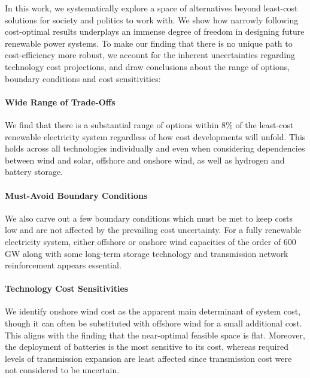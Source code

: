 In this work, we systematically explore a space of alternatives beyond
least-cost solutions for society and politics to work with. We show how narrowly
following cost-optimal results underplays an immense degree of freedom in
designing future renewable power systems. To make our finding that there is no
unique path to cost-efficiency more robust, we account for the inherent uncertainties
regarding technology cost projections, and draw conclusions about
the range of options, boundary conditions and cost sensitivities:

\paragraph{Wide Range of Trade-Offs}
We find that there is a substantial range of options
within 8\% of the least-cost renewable electricity system
regardless of how cost developments will unfold.
This holds across all technologies individually
and even when considering dependencies between
wind and solar, offshore and onshore wind, as well as hydrogen and battery storage.

\paragraph{Must-Avoid Boundary Conditions}
We also carve out a few boundary conditions which
must be met to keep costs low and are not affected
by the prevailing cost uncertainty.
For a fully renewable electricity system,
either offshore or onshore wind capacities
of the order of 600 GW
along with some long-term storage technology and
transmission network reinforcement appears essential.


\paragraph{Technology Cost Sensitivities}
We identify onshore wind cost as the apparent main determinant of system cost,
though it can often be substituted with offshore wind for a small additional
cost. This aligns with the finding that the near-optimal feasible space is flat.
Moreover, the deployment of batteries is the most sensitive to its cost, whereas
required levels of transmission expansion are least affected since transmission
cost were not considered to be uncertain. \\

